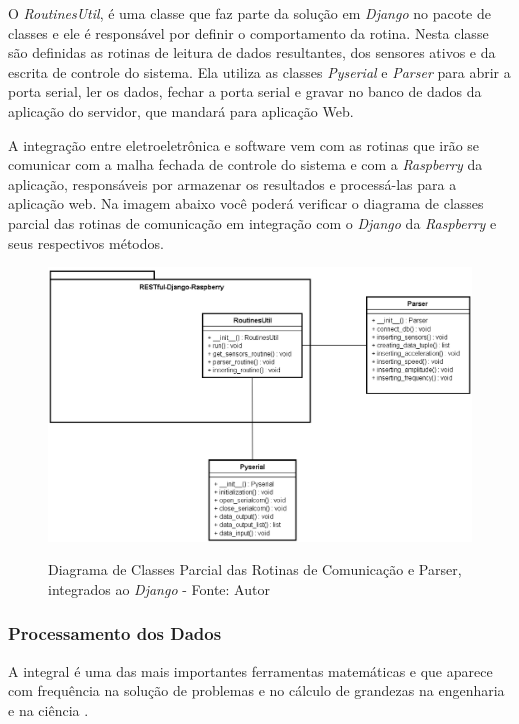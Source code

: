 O \textit{RoutinesUtil}, é uma classe que faz parte da solução em \textit{Django} no pacote de classes e ele é responsável por definir o comportamento 
da rotina. Nesta classe são definidas as rotinas de leitura de dados resultantes, dos sensores ativos e da escrita de controle do sistema. Ela utiliza 
as classes \textit{Pyserial} e \textit{Parser} para abrir a porta serial, ler os dados, fechar a porta serial e gravar no banco de dados da aplicação do 
servidor, que mandará para aplicação Web.

A integração entre eletroeletrônica e software vem com as rotinas que irão se comunicar com a malha fechada de controle do sistema e com a 
\textit{Raspberry} da aplicação, responsáveis por armazenar os resultados e processá-las para a aplicação web. Na imagem abaixo você poderá verificar 
o diagrama de classes parcial das rotinas de comunicação em integração com o \textit{Django} da \textit{Raspberry} e seus respectivos métodos.

\begin{figure}[H]
\centering
\includegraphics[keepaspectratio=true,scale=0.65]{figuras/uml_routines_parser.png}
\label{fig:uml_routines_parser}
\caption{Diagrama de Classes Parcial das Rotinas de Comunicação e Parser, integrados ao \textit{Django} - Fonte: Autor}
\end{figure}

\subsubsection*{\textbf{Processamento dos Dados}}

A integral é uma das mais importantes ferramentas matemáticas e que aparece com frequência na solução de problemas e no cálculo de grandezas 
na engenharia e na ciência \cite{metodos_numericos}.

